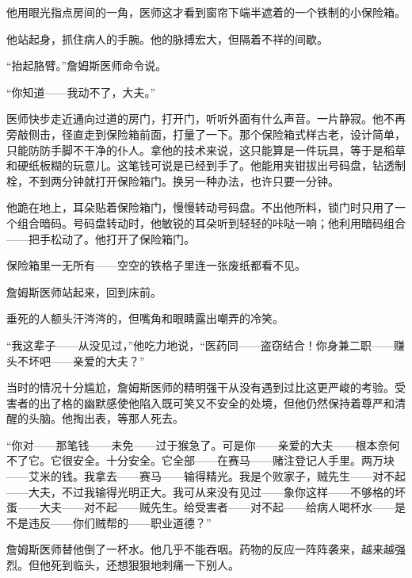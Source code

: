 \documentclass{article}
\begin{document}
他用眼光指点房间的一角，医师这才看到窗帘下端半遮着的一个铁制的小保险箱。



他站起身，抓住病人的手腕。他的脉搏宏大，但隔着不祥的间歇。



“抬起胳臂。”詹姆斯医师命令说。



“你知道——我动不了，大夫。”



医师快步走近通向过道的房门，打开门，听听外面有什么声音。一片静寂。他不再旁敲侧击，径直走到保险箱前面，打量了一下。那个保险箱式样古老，设计简单，只能防防手脚不干净的仆人。拿他的技术来说，这只能算是一件玩具，等于是稻草和硬纸板糊的玩意儿。这笔钱可说是已经到手了。他能用夹钳拔出号码盘，钻透制栓，不到两分钟就打开保险箱门。换另一种办法，也许只要一分钟。



他跪在地上，耳朵贴着保险箱门，慢慢转动号码盘。不出他所料，锁门时只用了一个组合暗码。号码盘转动时，他敏锐的耳朵听到轻轻的咔哒一响；他利用暗码组合——把手松动了。他打开了保险箱门。



保险箱里一无所有——空空的铁格子里连一张废纸都看不见。



詹姆斯医师站起来，回到床前。



垂死的人额头汗涔涔的，但嘴角和眼睛露出嘲弄的冷笑。



“我这辈子——从没见过，”他吃力地说，“医药同——盗窃结合！你身兼二职——赚头不坏吧——亲爱的大夫？”



当时的情况十分尴尬，詹姆斯医师的精明强干从没有遇到过比这更严峻的考验。受害者的出了格的幽默感使他陷入既可笑又不安全的处境，但他仍然保持着尊严和清醒的头脑。他掏出表，等那人死去。



“你对——那笔钱——未免——过于猴急了。可是你——亲爱的大夫——根本奈何不了它。它很安全。十分安全。它全部——在赛马——赌注登记人手里。两万块——艾米的钱。我拿去——赛马——输得精光。我是个败家子，贼先生——对不起——大夫，不过我输得光明正大。我可从来没有见过——象你这样——不够格的坏蛋——大夫——对不起——贼先生。给受害者——对不起——给病人喝杯水——是不是违反——你们贼帮的——职业道德？”



詹姆斯医师替他倒了一杯水。他几乎不能吞咽。药物的反应一阵阵袭来，越来越强烈。但他死到临头，还想狠狠地刺痛一下别人。
\end{document}
